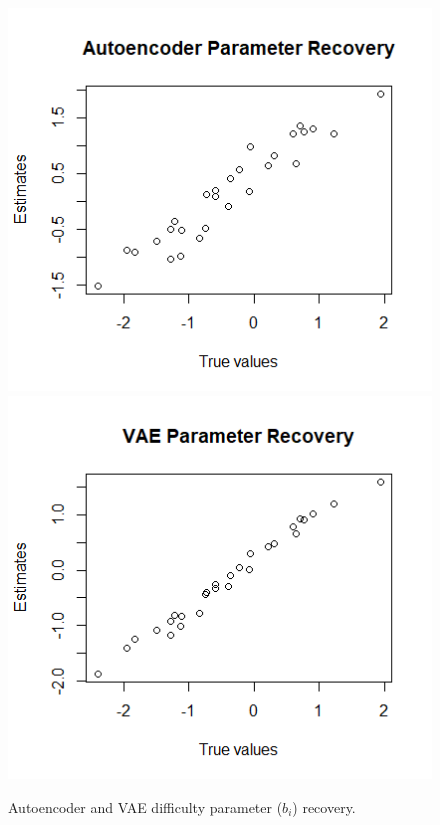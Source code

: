 \begin{figure}[h!]
   \includegraphics[width=\textwidth]{img/aied_results/ae_b_corr.png}
   \endminipage\hfill
   \includegraphics[width=\textwidth]{img/aied_results/vae_b_corr.png}
   \endminipage\hfill
   \caption{Autoencoder and VAE difficulty parameter ($b_i$) recovery.}
   \label{fig:vae_vs_ae_b}
\end{figure}

